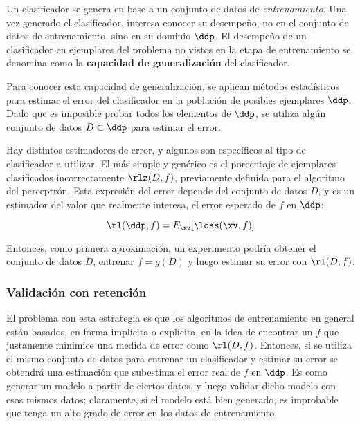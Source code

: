 
Un clasificador se genera en base a un conjunto de datos de \textit{entrenamiento}. Una vez generado el clasificador,  interesa conocer su desempeño, no en el conjunto de datos de entrenamiento, sino en su dominio $\ddp$. El desempeño de un clasificador en ejemplares del problema no vistos en la etapa de entrenamiento se denomina como la \textbf{capacidad de generalización} del clasificador. 

Para conocer esta capacidad de generalización, se aplican métodos estadísticos para estimar el error del clasificador en la población de posibles ejemplares $\ddp$. Dado que es imposible probar todos los elementos de $\ddp$, se utiliza algún conjunto de datos $D \subset \ddp$ para estimar el error.

Hay distintos estimadores de error, y algunos son específicos al tipo de clasificador a utilizar. El más simple y genérico es el porcentaje de ejemplares clasificados incorrectamente $\rlz(D,f)$, previamente definida para el algoritmo del perceptrón. Esta expresión del error depende del conjunto de datos $D$, y es un estimador del valor que realmente interesa, el error esperado de $f$ en $\ddp$:

\begin{equation}
  \rl(\ddp,f)= E_{\xv} [ \loss(\xv,f) ]
\end{equation}

Entonces, como primera aproximación, un experimento podría obtener el conjunto de datos $D$, entrenar $f=g(D)$ y luego estimar su error con $\rl(D,f)$. 

\subsubsection{Validación con retención}

El problema con esta estrategia es que los algoritmos de entrenamiento en general están basados, en forma implícita o explícita, en la idea de encontrar un $f$ que justamente minimice una medida de error como $\rl(D,f)$. Entonces, si se utiliza el mismo conjunto de datos para entrenar un clasificador y estimar su error se obtendrá una estimación que subestima el error real de $f$ en $\ddp$. Es como generar un modelo a partir de ciertos datos, y luego validar dicho modelo con esos mismos datos; claramente, si el modelo está bien generado, es improbable que tenga un alto grado de error en los datos de entrenamiento.


